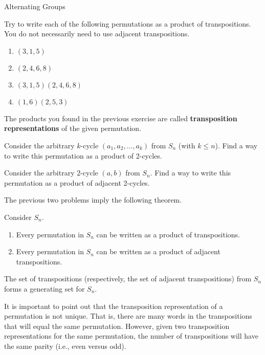 \begin{section}{Alternating Groups}
\begin{exercise}
Try to write each of the following permutations as a product of transpositions.  You do not necessarily need to use adjacent transpositions.
\begin{enumerate}[label=\rm{(\alph*)}]
\item $(3,1,5)$
\item $(2,4,6,8)$
\item $(3,1,5)(2,4,6,8)$
\item $(1,6)(2,5,3)$
\end{enumerate}
\end{exercise}

The products you found in the previous exercise are called \textbf{transposition representations} of the given permutation.

\begin{problem}
Consider the arbitrary $k$-cycle $(a_1,a_2,\ldots, a_k)$ from $S_n$ (with $k\leq n$).  Find a way to write this permutation as a product of 2-cycles. 
\end{problem}

\begin{problem}
Consider the arbitrary 2-cycle $(a,b)$ from $S_n$.  Find a way to write this permutation as a product of adjacent 2-cycles.
\end{problem}

The previous two problems imply the following theorem.

\begin{theorem}
Consider $S_n$.
\begin{enumerate}
\item Every permutation in $S_n$ can be written as a product of transpositions.
\item Every permutation in $S_n$ can be written as a product of adjacent transpositions.
\end{enumerate}
\end{theorem}

\begin{corollary}
The set of transpositions (respectively, the set of adjacent transpositions) from $S_n$ forms a generating set for $S_n$.
\end{corollary}

It is important to point out that the transposition representation of a permutation is not unique.  That is, there are many words in the transpositions that will equal the same permutation.  However, given two transposition representations for the same permutation, the number of transpositions will have the same parity (i.e., even versus odd).


\end{section}
